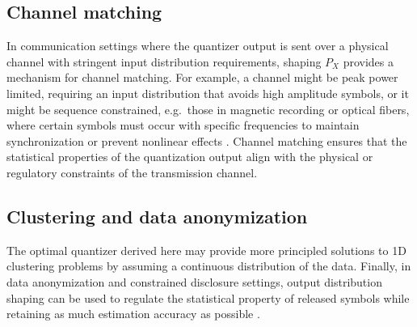 \documentclass[conference]{IEEEtran}
\begin{document}
\subsection{Channel matching}
In communication settings where the quantizer output is sent over a physical channel with stringent input distribution requirements, shaping \(P_X\) provides a mechanism for {channel matching}. 
For example, a channel might be peak power limited, requiring an input distribution that avoids high amplitude symbols, or it might be sequence constrained, e.g.\ those in magnetic recording or optical fibers, where certain symbols must occur with specific frequencies to maintain synchronization or prevent nonlinear effects \cite{MarcusRothSiegel}.
Channel matching ensures that the statistical properties of the quantization output align with the physical or regulatory constraints of the transmission channel.


\subsection{Clustering and data anonymization}
The optimal quantizer derived here may provide more principled solutions to 1D clustering problems \cite{Ckmeans_1ddp,Nielsen_1d_cluster} by assuming a continuous distribution of the data.
Finally, in data anonymization and constrained disclosure settings, output distribution shaping can be used to regulate the statistical property of released symbols while retaining as much estimation accuracy as possible \cite{REBOLLOMONEDERO2013185,dist_prsv_k_anonym}.
\end{document}
